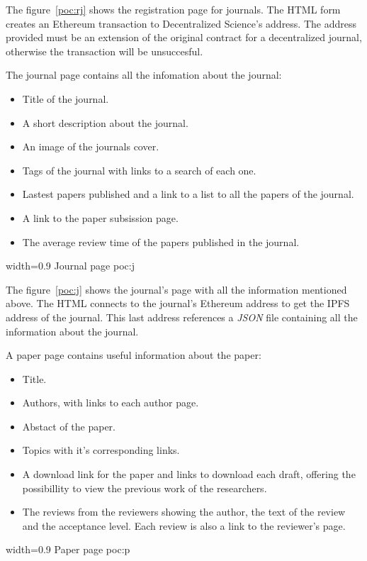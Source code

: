 The figure~\ref{poc:rj} shows the registration page for journals. The HTML form
creates an Ethereum transaction to Decentralized Science's address. The address
provided must be an extension of the original contract for a decentralized
journal, otherwise the transaction will be unsuccesful. 

The journal page contains all the infomation about the journal:
\begin{itemize}
\item Title of the journal.
\item A short description about the journal.
\item An image of the journals cover.
\item Tags of the journal with links to a search of each one.
\item Lastest papers published and a link to a list to all the papers of the
  journal.
\item A link to the paper subsission page.
\item The average review time of the papers published in the journal.
\end{itemize}

%
{width=0.9\linewidth}%
{Journal page}%
{poc:j}

The figure~\ref{poc:j} shows the journal's page with all the information
mentioned above. The HTML connects to the journal's Ethereum address to get the
IPFS address of the journal. This last address references a \emph{JSON} file
containing all the information about the journal.



A paper page contains useful information about the paper:
\begin{itemize}
\item Title.
\item Authors, with links to each author page.
\item Abstact of the paper.
\item Topics with it's corresponding links.
\item A download link for the paper and links to download each draft, offering
  the possibillity to view the previous work of the researchers.
\item The reviews from the reviewers showing the author, the text of the review
  and the acceptance level. Each review is also a link to the reviewer's page.
\end{itemize}
%
{width=0.9\linewidth}%
{Paper page}%
{poc:p}

